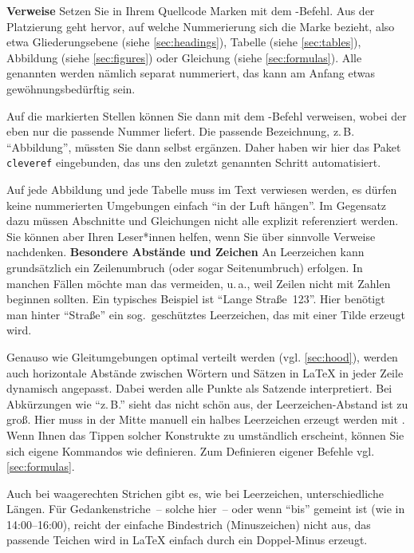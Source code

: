 \textbf{Verweise}
\label{sec:references}
Setzen Sie in Ihrem Quellcode Marken mit dem -Befehl. Aus der Platzierung geht hervor, auf welche Nummerierung sich die Marke bezieht, also etwa Gliederungsebene (siehe \cref{sec:headings}), Tabelle (siehe \cref{sec:tables}), Abbildung (siehe \cref{sec:figures}) oder Gleichung (siehe \cref{sec:formulas}). Alle genannten werden nämlich separat nummeriert, das kann am Anfang etwas gewöhnungsbedürftig sein.
\par
Auf die markierten Stellen können Sie dann mit dem -Befehl verweisen, wobei der eben nur die passende Nummer liefert. Die passende Bezeichnung, z.\,B. \enquote{Abbildung}, müssten Sie dann selbst ergänzen. Daher haben wir hier das Paket \texttt{cleveref} eingebunden, das uns den zuletzt genannten Schritt automatisiert.
\par
Auf jede Abbildung und jede Tabelle muss im Text verwiesen werden, es dürfen keine nummerierten Umgebungen einfach \enquote{in der Luft hängen}. Im Gegensatz dazu müssen Abschnitte und Gleichungen nicht alle explizit referenziert werden. Sie können aber Ihren Leser*innen helfen, wenn Sie über sinnvolle Verweise nachdenken.
%
%
\textbf{Besondere Abstände und Zeichen}
\label{sec:specialCases}
An Leerzeichen kann grundsätzlich ein Zeilenumbruch (oder sogar Seitenumbruch) erfolgen. In manchen Fällen möchte man das vermeiden, u.\,a., weil Zeilen nicht mit Zahlen beginnen sollten. Ein typisches Beispiel ist \enquote{Lange Straße~123}. Hier benötigt man hinter \enquote{Straße} ein sog.\ geschütztes Leerzeichen, das mit einer Tilde erzeugt wird.
\par
Genauso wie Gleitumgebungen optimal verteilt werden (vgl. \cref{sec:hood}), werden auch horizontale Abstände zwischen Wörtern und Sätzen in \LaTeX{} in jeder Zeile dynamisch angepasst. Dabei werden alle Punkte als Satzende interpretiert. Bei Abkürzungen wie \enquote{z.\,B.} sieht das nicht schön aus, der Leerzeichen-Abstand ist zu groß. Hier muss in der Mitte manuell ein halbes Leerzeichen erzeugt werden mit \comm{,}. Wenn Ihnen das Tippen solcher Konstrukte zu umständlich erscheint, können Sie sich eigene Kommandos wie  definieren. Zum Definieren eigener Befehle vgl. \cref{sec:formulas}.
\par
Auch bei waagerechten Strichen gibt es, wie bei Leerzeichen, unterschiedliche Längen. Für Gedankenstriche~-- solche hier~-- oder wenn \enquote{bis} gemeint ist (wie in 14:00--16:00), reicht der einfache Bindestrich (Minuszeichen) nicht aus, das passende Teichen wird in \LaTeX{} einfach durch ein Doppel-Minus erzeugt.
